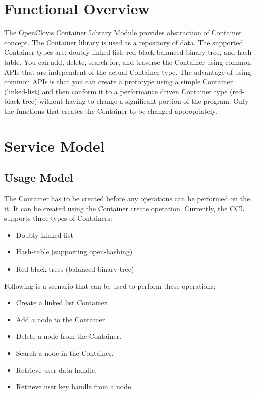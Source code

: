 
\hypertarget{group__group12}{
\chapter{Functional Overview}
\label{group__group12}
}


The OpenClovis Container Library Module provides abstraction of Container concept. The Container library is used as a repository of data.
The supported Container types are: doubly-linked-list, red-black 
balanced binary-tree, and hash-table. You can add, delete, search-for, and traverse the Container using common APIs that are independent of the 
actual Container type. The advantage of using common APIs is that you can create a prototype using a simple Container (linked-list) and 
then conform it to a performance driven Container type (red-black tree) without having to change a significant portion of the program. Only the functions 
that creates the Container to be changed appropriately. 



\chapter{Service Model}
\section{Usage Model}

The Container has to be created before any operations can be performed on the it. It can be created using the
Container create operation. Currently, the CCL supports three types of Containers:
\begin{itemize}
\item
Doubly Linked list
\item
Hash-table (supporting open-hashing)
\item
Red-black trees (balanced binary tree)
\end{itemize}

Following is a scenario that can be used to perform these operations:
\begin{itemize}
\item
Create a linked list Container.
\item
Add a node to the Container.
\item
Delete a node from the Container.
\item
Search a node in the Container.
\item
Retrieve user data handle.
\item
Retrieve user key handle from a node.
\end{itemize}



